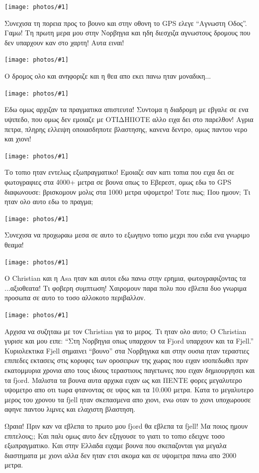 \documentclass[11pt, letterpaper]{book}
\newcommand\photo[1]{\begin{center}\noindent\texttt{[image: photos/\#1]}\end{center}}
\begin{document}
\photo{170.jpg}

Συνεχισα τη πορεια προς το βουνο και στην οθονη το GPS ελεγε ``Αγνωστη Οδος''. Γαμω! Τη πρωτη μερα μου στην Νορβηγια και ηδη διεσχιζα αγνωστους δρομους που δεν υπαρχουν καν στο χαρτη! Αυτα ειναι! 

\photo{171.jpg}

Ο δρομος ολο και ανηφοριζε και η θεα απο εκει πανω ηταν μοναδικη...

\photo{172.jpg}

Εδω ομως αρχιζαν τα πραγματικα απιστευτα!
Συντομα η διαδρομη με εβγαλε σε ενα υψιπεδο, που ομως δεν εμοιαζε με ΟΤΙΔΗΠΟΤΕ αλλο ειχα δει στο παρελθον!
Αγρια πετρα, πληρης ελλειψη οποιασδηποτε βλαστησης, κανενα δεντρο, ομως παντου νερο και χιονι! 

\photo{173.jpg}

Το τοπιο ηταν εντελως εξωπραγματικο! Εμοιαζε σαν κατι τοπια που ειχα δει σε φωτογραφιες στα 4000+ μετρα σε βουνα οπως το Εβερεστ, ομως εδω το GPS διαφωνουσε: βρισκομουν μολις στα 1000 μετρα υψομετρο! 
Τοτε πως; Που ημουν; Τι ηταν ολο αυτο εδω το πραγμα;

\photo{174.jpg}

Συνεχισα να προχωραω μεσα σε αυτο το εξωγηινο τοπιο μεχρι που ειδα ενα γνωριμο θεαμα!

\photo{175.jpg}

Ο Christian και η Asa ηταν και αυτοι εδω πανω στην ερημια, φωτογραφιζοντας τα ...αξιοθεατα!
Τι φοβερη συμπτωση! Χαιρομουν παρα πολυ που εβλεπα δυο γνωριμα προσωπα σε αυτο το τοσο αλλοκοτο περιβαλλον. 

\photo{176.jpg}

Αρχισα να συζηταω με τον Christian για το μερος. Τι ηταν ολο αυτο; 
Ο Christian γυρισε και μου ειπε: ``Στη Νορβηγια οπως υπαρχουν τα Fjord υπαρχουν και τα Fjell.''
Κυριολεκτικα Fjell σημαινει ``βουνο'' στα Νορβηγικα και στην ουσια ηταν τεραστιες επιπεδες εκτασεις στις κορυφες των οροσειρων της χωρας που ειχαν ισοπεδωθει πριν εκατομμυρια χρονια απο τους ιδιους τεραστιους παγετωνες που ειχαν δημιουργησει και τα fjord. Μαλιστα τα βουνα αυτα αρχικα ειχαν ως και ΠΕΝΤΕ φορες μεγαλυτερο υψομετρο απο οτι τωρα φτανοντας σε υψος και τα 10.000 μετρα.
Κατα το μεγαλυτερο μερος του χρονου τα fjell ηταν σκεπασμενα απο χιονι, ενω οταν το χιονι υποχωρουσε αφηνε παντου λιμνες και ελαχιστη βλαστηση.

Ωραια! Πριν καν να εβλεπα το πρωτο μου fjord θα εβλεπα τα fjell! Μα ποιος ημουν επιτελους;; 
Και παλι ομως αυτο δεν εξηγουσε το γιατι το τοπιο εδειχνε τοσο εξωπραγματικο. Και στην Ελλαδα ειχαμε βουνα που σκεπαζονται για μεγαλα διαστηματα με χιονι αλλα δεν ηταν ετσι ακομα και σε υψομετρα πανω απο 2000 μετρα. 
\end{document}
